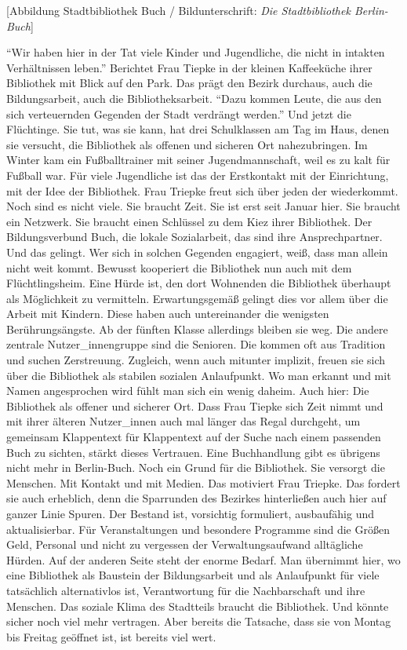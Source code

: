 \documentclass[a4paper,
fontsize=11pt,
oneside,
numbers=noperiodatend,
parskip=half-,
bibliography=totoc,
final
]{scrartcl}
\begin{document}
{[}Abbildung Stadtbibliothek Buch / Bildunterschrift: \emph{Die
Stadtbibliothek Berlin-Buch}{]}

\enquote{Wir haben hier in der Tat viele Kinder und Jugendliche, die
nicht in intakten Verhältnissen leben.} Berichtet Frau Tiepke in der
kleinen Kaffeeküche ihrer Bibliothek mit Blick auf den Park. Das prägt
den Bezirk durchaus, auch die Bildungsarbeit, auch die
Bibliotheksarbeit. \enquote{Dazu kommen Leute, die aus den sich
verteuernden Gegenden der Stadt verdrängt werden.} Und jetzt die
Flüchtinge. Sie tut, was sie kann, hat drei Schulklassen am Tag im Haus,
denen sie versucht, die Bibliothek als offenen und sicheren Ort
nahezubringen. Im Winter kam ein Fußballtrainer mit seiner
Jugendmannschaft, weil es zu kalt für Fußball war. Für viele Jugendliche
ist das der Erstkontakt mit der Einrichtung, mit der Idee der
Bibliothek. Frau Triepke freut sich über jeden der wiederkommt. Noch
sind es nicht viele. Sie braucht Zeit. Sie ist erst seit Januar hier.
Sie braucht ein Netzwerk. Sie braucht einen Schlüssel zu dem Kiez ihrer
Bibliothek. Der Bildungsverbund Buch, die lokale Sozialarbeit, das sind
ihre Ansprechpartner. Und das gelingt. Wer sich in solchen Gegenden
engagiert, weiß, dass man allein nicht weit kommt. Bewusst kooperiert
die Bibliothek nun auch mit dem Flüchtlingsheim. Eine Hürde ist, den
dort Wohnenden die Bibliothek überhaupt als Möglichkeit zu vermitteln.
Erwartungsgemäß gelingt dies vor allem über die Arbeit mit Kindern.
Diese haben auch untereinander die wenigsten Berührungsängste. Ab der
fünften Klasse allerdings bleiben sie weg. Die andere zentrale
Nutzer\_innengruppe sind die Senioren. Die kommen oft aus Tradition und
suchen Zerstreuung. Zugleich, wenn auch mitunter implizit, freuen sie
sich über die Bibliothek als stabilen sozialen Anlaufpunkt. Wo man
erkannt und mit Namen angesprochen wird fühlt man sich ein wenig daheim.
Auch hier: Die Bibliothek als offener und sicherer Ort. Dass Frau Tiepke
sich Zeit nimmt und mit ihrer älteren Nutzer\_innen auch mal länger das
Regal durchgeht, um gemeinsam Klappentext für Klappentext auf der Suche
nach einem passenden Buch zu sichten, stärkt dieses Vertrauen. Eine
Buchhandlung gibt es übrigens nicht mehr in Berlin-Buch. Noch ein Grund
für die Bibliothek. Sie versorgt die Menschen. Mit Kontakt und mit
Medien. Das motiviert Frau Triepke. Das fordert sie auch erheblich, denn
die Sparrunden des Bezirkes hinterließen auch hier auf ganzer Linie
Spuren. Der Bestand ist, vorsichtig formuliert, ausbaufähig und
aktualisierbar. Für Veranstaltungen und besondere Programme sind die
Größen Geld, Personal und nicht zu vergessen der Verwaltungsaufwand
alltägliche Hürden. Auf der anderen Seite steht der enorme Bedarf. Man
übernimmt hier, wo eine Bibliothek als Baustein der Bildungsarbeit und
als Anlaufpunkt für viele tatsächlich alternativlos ist, Verantwortung
für die Nachbarschaft und ihre Menschen. Das soziale Klima des
Stadtteils braucht die Bibliothek. Und könnte sicher noch viel mehr
vertragen. Aber bereits die Tatsache, dass sie von Montag bis Freitag
geöffnet ist, ist bereits viel wert.
\end{document}
